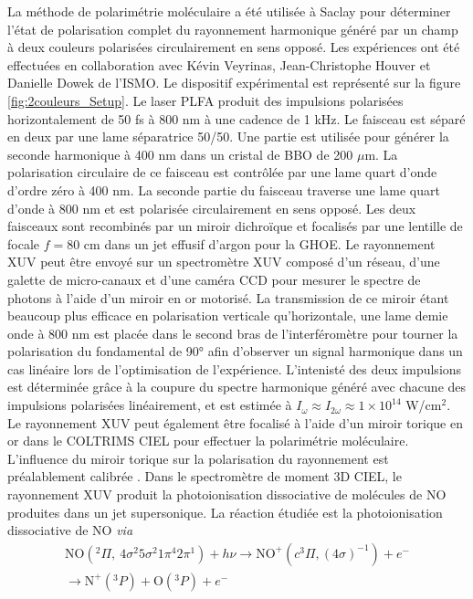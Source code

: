 La méthode de polarimétrie moléculaire a été utilisée à Saclay pour déterminer l'état de polarisation complet du rayonnement harmonique généré par un champ à deux couleurs polarisées circulairement en sens opposé. Les expériences ont été effectuées en collaboration avec Kévin Veyrinas, Jean-Christophe Houver et Danielle Dowek de l'ISMO. Le dispositif expérimental est représenté sur la figure \ref{fig:2couleurs_Setup}. Le laser PLFA  produit des impulsions polarisées horizontalement de 50 fs à 800 nm à une cadence de 1 kHz. Le faisceau est séparé en deux par une lame séparatrice 50/50. Une partie est utilisée pour générer la seconde harmonique à 400 nm dans un cristal de BBO de 200 $\mu$m. La polarisation circulaire de ce faisceau est contrôlée par une lame quart d'onde d'ordre zéro à 400 nm. La seconde partie du faisceau traverse une lame quart d'onde à 800 nm et est polarisée circulairement en sens opposé. Les deux faisceaux sont recombinés par un miroir dichroïque et focalisés par une lentille de focale $f = 80$ cm dans un jet effusif d'argon pour la GHOE. Le rayonnement XUV peut être envoyé sur un spectromètre XUV composé d'un réseau, d'une galette de micro-canaux et d'une caméra CCD pour mesurer le spectre de photons à l'aide d'un miroir en or motorisé. La transmission de ce miroir étant beaucoup plus efficace en polarisation verticale qu'horizontale, une lame demie onde à 800 nm est placée dans le second bras de l'interféromètre pour tourner la polarisation du fondamental de 90° afin d'observer un signal harmonique dans un cas linéaire lors de l'optimisation de l'expérience. L'intenisté des deux impulsions est déterminée grâce à la coupure du spectre harmonique généré avec chacune des impulsions polarisées linéairement, et est estimée à $I_\omega \approx I_{2\omega} \approx 1 \times 10^{14}$ W/cm$^2$. Le rayonnement XUV peut également être focalisé à l'aide d'un miroir torique en or dans le COLTRIMS CIEL  pour effectuer la polarimétrie moléculaire. L'influence du miroir torique sur la polarisation du rayonnement est préalablement calibrée . Dans le spectromètre de moment 3D CIEL, le rayonnement XUV produit la photoionisation dissociative de molécules de NO produites dans un jet supersonique. La réaction étudiée est la photoionisation dissociative de NO \textit{via}
\begin{multline}
\text{NO}(^2\Pi, \: 4\sigma^2 5\sigma^2 1\pi^4 2\pi^1) + h\nu \longrightarrow \text{NO}^+ (c ^3\Pi, (4\sigma)^{-1})  + e^- \\\longrightarrow \text{N}^+ (^3P) + \text{O} (^3P) + e^-
\label{eq:PID_NO}
\end{multline}
